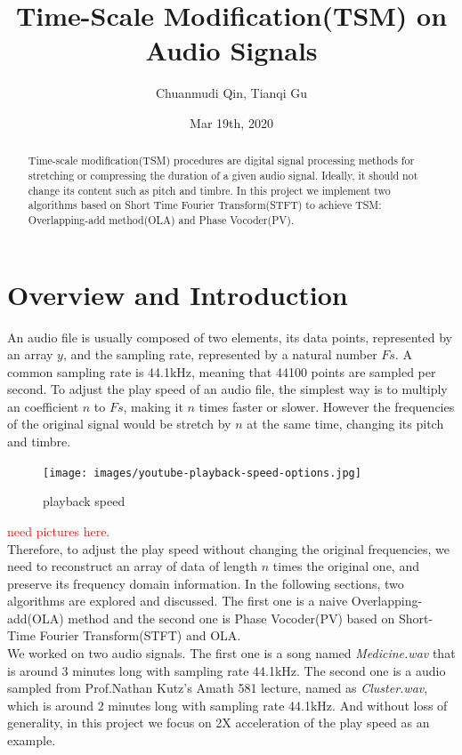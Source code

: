 \documentclass{article}
\title{Time-Scale Modification(TSM) on Audio Signals}
\author{Chuanmudi Qin, Tianqi Gu}
\date{Mar 19th, 2020}
\begin{document}
\maketitle

\begin{abstract}
    Time-scale modification(TSM) procedures are digital signal processing methods for stretching or compressing the duration of a given audio signal. Ideally, it should not change its content such as pitch and timbre. In this project we implement two algorithms based on Short Time Fourier Transform(STFT) to achieve TSM: Overlapping-add method(OLA) and Phase Vocoder(PV). 
\end{abstract}

\section{Overview and Introduction}
An audio file is usually composed of two elements, its data points, represented by an array $y$, and the sampling rate, represented by a natural number $Fs$. A common sampling rate is 44.1kHz, meaning that 44100 points are sampled per second. To adjust the play speed of an audio file, the simplest way is to multiply an coefficient $n$ to $Fs$, making it $n$ times faster or slower. However the frequencies of the original signal would be stretch by $n$ at the same time, changing its pitch and timbre.
\begin{figure}[H]
\centering        
\texttt{[image: images/youtube-playback-speed-options.jpg]}
\caption{playback speed}
\end{figure}
\textcolor{red}{need pictures here.}\\
Therefore, to adjust the play speed without changing the original frequencies, we need to reconstruct an array of data of length $n$ times the original one, and preserve its frequency domain information. In the following sections, two algorithms are explored and discussed. The first one is a naive Overlapping-add(OLA) method and the second one is Phase Vocoder(PV) based on Short-Time Fourier Transform(STFT) and OLA.\\
We worked on two audio signals. The first one is a song named \textit{Medicine.wav} that is around 3 minutes long with sampling rate 44.1kHz. The second one is a audio sampled from Prof.Nathan Kutz's Amath 581 lecture, named as \textit{Cluster.wav}, which is around 2 minutes long with sampling rate 44.1kHz. And without loss of generality, in this project we focus on 2X acceleration of the play speed as an example.
\end{document}
